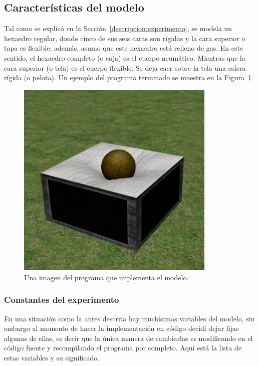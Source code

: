 \subsection{Características del modelo}
Tal como se explicó en la Sección~\ref{descripcion:experimento}, se modela un hexaedro regular, donde cinco de sus seis caras son rígidas y la cara superior o tapa es flexible: además, asumo que este hexaedro está relleno de gas.
En este sentido, el hexaedro completo (o caja) es el cuerpo neumático.
Mientras que la cara superior (o tela) es el cuerpo flexible.
Se deja caer sobre la tela una esfera rígida (o pelota).
Un ejemplo del programa terminado se muestra en la Figura~\ref{programa:portada}.
\begin{figure}
 \centering
 \includegraphics[width=0.85\textwidth]{Img/04/modeloPortada}
 \caption[Ejemplo del programa en ejecución]{Una imagen del programa que implementa el modelo.}
 \label{programa:portada}
\end{figure}

\subsubsection{Constantes del experimento}
En una situación como la antes descrita hay muchísimas variables del modelo, sin embargo al momento de hacer la implementación en código decidí dejar fijas algunas de ellas, es decir que la única manera de cambiarlas es modificando en el código fuente y recompilando el programa por completo.
Aquí está la lista de estas variables y su significado.

